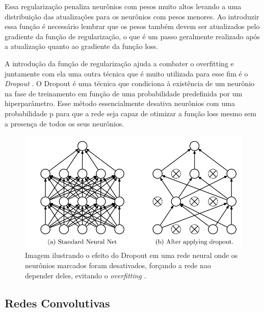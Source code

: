 Essa regularização penaliza neurônios com pesos muito altos levando a uma distribuição das atualizações para os neurônios com pesos menores. Ao introduzir essa função é necessário lembrar que os pesos também devem ser atualizados pelo gradiente da função de regularização, o que é um passo geralmente realizado após a atualização quanto ao gradiente da função loss.

A introdução da função de regularização ajuda a combater o overfitting e juntamente com ela uma outra técnica que é muito utilizada para esse fim é o \textit{Dropout} \cite{dropout2014}. O Dropout é uma técnica que condiciona à existência de um neurônio na fase de treinamento em função de uma probabilidade predefinida por um hiperparâmetro. Esse método essencialmente desativa neurônios com uma probabilidade p para que a rede seja capaz de otimizar a função loss mesmo sem a presença de todos os seus neurônios.

\begin{figure}[h]
	\centering
	\includegraphics[scale=0.4]{pasta1_figuras/dropout.png}
	\caption{Imagem ilustrando o efeito do Dropout em uma rede neural onde os neurônios marcados foram desativados, forçando a rede nao depender deles, evitando o \textit{overfitting} \cite{dropout2014}.}
	
	\label{fig-dropout}
\end{figure}

\subsection{Redes Convolutivas}

